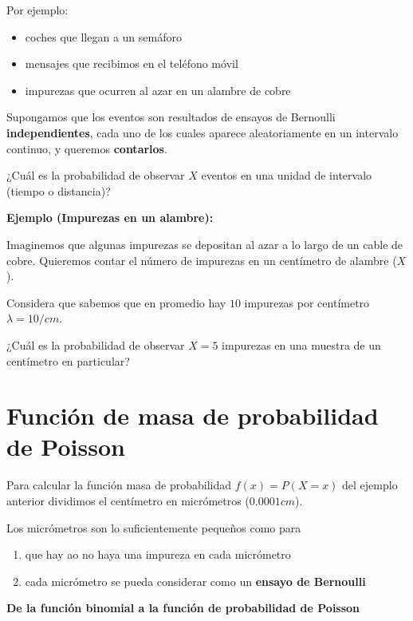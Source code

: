 \documentclass[
]{book}
\providecommand{\tightlist}{%
  \setlength{\itemsep}{0pt}\setlength{\parskip}{0pt}}
\begin{document}
Por ejemplo:

\begin{itemize}
\tightlist
\item
  coches que llegan a un semáforo
\item
  mensajes que recibimos en el teléfono móvil
\item
  impurezas que ocurren al azar en un alambre de cobre
\end{itemize}

Supongamos que los eventos son resultados de ensayos de Bernoulli \textbf{independientes}, cada uno de los cuales aparece aleatoriamente en un intervalo continuo, y queremos \textbf{contarlos}.

¿Cuál es la probabilidad de observar \(X\) eventos en una unidad de intervalo (tiempo o distancia)?

\textbf{Ejemplo (Impurezas en un alambre):}

Imaginemos que algunas impurezas se depositan al azar a lo largo de un cable de cobre. Quieremos contar el número de impurezas en un centímetro de alambre (\(X\)).

Considera que sabemos que en promedio hay \(10\) impurezas por centímetro \(\lambda=10/cm\).

¿Cuál es la probabilidad de observar \(X=5\) impurezas en una muestra de un centímetro en particular?

\hypertarget{funciuxf3n-de-masa-de-probabilidad-de-poisson}{%
\section{Función de masa de probabilidad de Poisson}\label{funciuxf3n-de-masa-de-probabilidad-de-poisson}}

Para calcular la función masa de probabilidad \(f(x)=P(X=x)\) del ejemplo anterior dividimos el centímetro en micrómetros (\(0.0001cm\)).

Los micrómetros son lo suficientemente pequeños como para

\begin{enumerate}
\def\labelenumi{\arabic{enumi})}
\item
  que hay ao no haya una impureza en cada micrómetro
\item
  cada micrómetro se pueda considerar como un \textbf{ensayo de Bernoulli}
\end{enumerate}

\textbf{De la función binomial a la función de probabilidad de Poisson}
\end{document}
